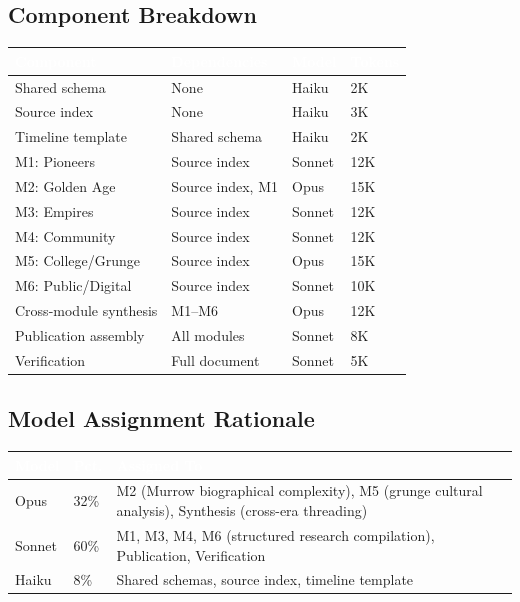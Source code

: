 \documentclass[11pt,letterpaper]{article}
\newcommand{\tableheader}[1]{\textbf{\sffamily\textcolor{white}{#1}}}
\begin{document}
\subsection{Component Breakdown}

\begin{center}
\begin{tabularx}{\textwidth}{L{3.5cm}L{2.5cm}C{1.5cm}C{1.5cm}}
\toprule
{}
\tableheader{Component} & \tableheader{Dependencies} & \tableheader{Model} & \tableheader{Tokens} \\
\midrule
Shared schema & None & Haiku & 2K \\
Source index & None & Haiku & 3K \\
Timeline template & Shared schema & Haiku & 2K \\
M1: Pioneers & Source index & Sonnet & 12K \\
M2: Golden Age & Source index, M1 & Opus & 15K \\
M3: Empires & Source index & Sonnet & 12K \\
M4: Community & Source index & Sonnet & 12K \\
M5: College/Grunge & Source index & Opus & 15K \\
M6: Public/Digital & Source index & Sonnet & 10K \\
Cross-module synthesis & M1--M6 & Opus & 12K \\
Publication assembly & All modules & Sonnet & 8K \\
Verification & Full document & Sonnet & 5K \\
\bottomrule
\end{tabularx}
\end{center}

\subsection{Model Assignment Rationale}

\begin{center}
\begin{tabularx}{\textwidth}{C{1.5cm}C{1.5cm}X}
\toprule
{}
\tableheader{Model} & \tableheader{Pct.} & \tableheader{Assigned To} \\
\midrule
Opus & 32\% & M2 (Murrow biographical complexity), M5 (grunge cultural analysis), Synthesis (cross-era threading) \\
Sonnet & 60\% & M1, M3, M4, M6 (structured research compilation), Publication, Verification \\
Haiku & 8\% & Shared schemas, source index, timeline template \\
\bottomrule
\end{tabularx}
\end{center}
\end{document}
